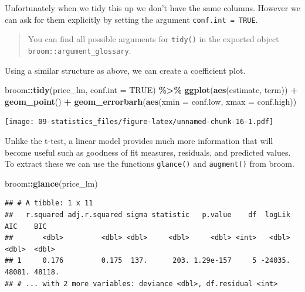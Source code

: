 \documentclass[
]{book}
\newenvironment{Shaded}{\begin{snugshade}}{\end{snugshade}}
\newcommand{\DataTypeTok}[1]{\textcolor[rgb]{0.13,0.29,0.53}{#1}}
\newcommand{\KeywordTok}[1]{\textcolor[rgb]{0.13,0.29,0.53}{\textbf{#1}}}
\newcommand{\NormalTok}[1]{#1}
\newcommand{\OperatorTok}[1]{\textcolor[rgb]{0.81,0.36,0.00}{\textbf{#1}}}
\newcommand{\OtherTok}[1]{\textcolor[rgb]{0.56,0.35,0.01}{#1}}
\newcommand{\StringTok}[1]{\textcolor[rgb]{0.31,0.60,0.02}{#1}}
\begin{document}
Unfortunately when we tidy this up we don't have the same columns. However we can ask for them explicitly by setting the argument \texttt{conf.int\ =\ TRUE}.

\begin{quote}
You can find all possible arguments for \texttt{tidy()} in the exported object \texttt{broom::argument\_glossary}.
\end{quote}

Using a similar structure as above, we can create a coefficient plot.

\begin{Shaded}
\begin{Highlighting}[]
\NormalTok{broom}\OperatorTok{::}\KeywordTok{tidy}\NormalTok{(price\_lm, }\DataTypeTok{conf.int =} \OtherTok{TRUE}\NormalTok{) }\OperatorTok{\%\textgreater{}\%}\StringTok{ }
\StringTok{  }\KeywordTok{ggplot}\NormalTok{(}\KeywordTok{aes}\NormalTok{(estimate, term)) }\OperatorTok{+}
\StringTok{  }\KeywordTok{geom\_point}\NormalTok{() }\OperatorTok{+}\StringTok{ }
\StringTok{  }\KeywordTok{geom\_errorbarh}\NormalTok{(}\KeywordTok{aes}\NormalTok{(}\DataTypeTok{xmin =}\NormalTok{ conf.low, }\DataTypeTok{xmax =}\NormalTok{ conf.high))}
\end{Highlighting}
\end{Shaded}

\texttt{[image: 09-statistics\_files/figure-latex/unnamed-chunk-16-1.pdf]}

Unlike the t-test, a linear model provides much more information that will become useful such as goodness of fit measures, residuals, and predicted values. To extract these we can use the functions \texttt{glance()} and \texttt{augment()} from broom.

\begin{Shaded}
\begin{Highlighting}[]
\NormalTok{broom}\OperatorTok{::}\KeywordTok{glance}\NormalTok{(price\_lm)}
\end{Highlighting}
\end{Shaded}

\begin{verbatim}
## # A tibble: 1 x 11
##   r.squared adj.r.squared sigma statistic   p.value    df  logLik    AIC    BIC
##       <dbl>         <dbl> <dbl>     <dbl>     <dbl> <int>   <dbl>  <dbl>  <dbl>
## 1     0.176         0.175  137.      203. 1.29e-157     5 -24035. 48081. 48118.
## # ... with 2 more variables: deviance <dbl>, df.residual <int>
\end{verbatim}
\end{document}
